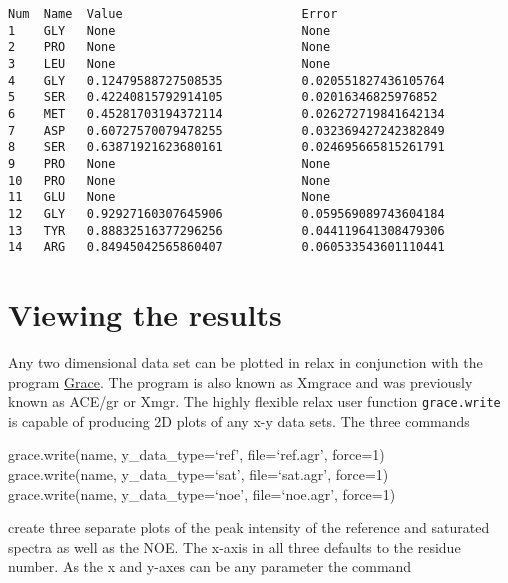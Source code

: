 {\footnotesize \begin{verbatim}
Num  Name  Value                         Error
1    GLY   None                          None
2    PRO   None                          None
3    LEU   None                          None
4    GLY   0.12479588727508535           0.020551827436105764
5    SER   0.42240815792914105           0.02016346825976852
6    MET   0.45281703194372114           0.026272719841642134
7    ASP   0.60727570079478255           0.032369427242382849
8    SER   0.63871921623680161           0.024695665815261791
9    PRO   None                          None
10   PRO   None                          None
11   GLU   None                          None
12   GLY   0.92927160307645906           0.059569089743604184
13   TYR   0.88832516377296256           0.044119641308479306
14   ARG   0.84945042565860407           0.060533543601110441
\end{verbatim}}




\section{Viewing the results}

Any two dimensional data set can be plotted in relax in conjunction with the program \href{http://plasma-gate.weizmann.ac.il/Grace/}{Grace}.  The program is also known as Xmgrace and was previously known as ACE/gr or Xmgr.  The highly flexible relax user function \texttt{grace.write} is capable of producing 2D plots of any x-y data sets.  The three commands

\begin{exampleenv}
grace.write(name, y\_data\_type=`ref', file=`ref.agr', force=1) \\
grace.write(name, y\_data\_type=`sat', file=`sat.agr', force=1) \\
grace.write(name, y\_data\_type=`noe', file=`noe.agr', force=1)
\end{exampleenv}

create three separate plots of the peak intensity of the reference and saturated spectra as well as the NOE.  The x-axis in all three defaults to the residue number.  As the x and y-axes can be any parameter the command


